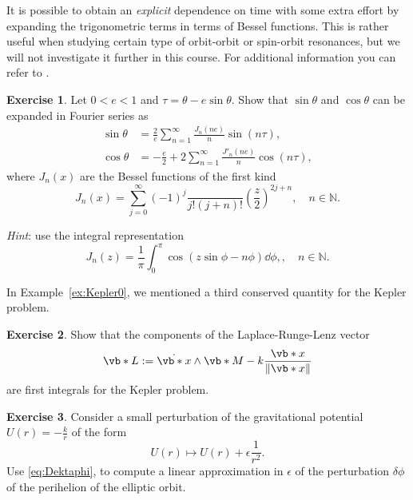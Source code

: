 \documentclass[english,fontsize=11pt,paper=b5]{scrbook}
\numberwithin{equation}{chapter}
\theoremstyle{definition}
\newtheorem{exercise}{Exercise}[chapter]
\begin{document}
    It is possible to obtain an \emph{explicit} dependence on time with some extra effort by expanding the trigonometric terms in terms of Bessel functions. This is rather useful when studying certain type of orbit-orbit or spin-orbit resonances, but we will not investigate it further in this course. For additional information you can refer to \cite{book:arnoldcelestial, book:celletti}.

    \begin{exercise}
      Let $0<e<1$ and $\tau = \theta - e\sin\theta$.
      Show that $\sin\theta$ and $\cos\theta$ can be expanded in Fourier series as
      \begin{align}
        \sin\theta & = \frac2e \sum_{n=1}^\infty \frac{J_n(ne)}{n} \sin(n\tau),        \\
        \cos\theta & = -\frac e2 + 2 \sum_{n=1}^\infty \frac{J'_n(ne)}{n} \cos(n\tau),
      \end{align}
      where $J_n(x)$ are the Bessel functions of the first kind
      \begin{equation}
        J_n(x) = \sum_{j=0}^\infty (-1)^j\frac{}{j!(j+n)!}\left(\frac z2\right)^{2j+n}, \quad n\in\mathbb{N}.
      \end{equation}

      \emph{Hint}: use the integral representation
      \begin{equation}
        J_n(z) = \frac1\pi \int_0^\pi \cos\left(z\sin\phi - n \phi\right)\dd\phi,, \quad n\in\mathbb{N}.
      \end{equation}
    \end{exercise}

    In Example~\ref{ex:Kepler0}, we mentioned a third conserved quantity for the Kepler problem.
    \begin{exercise}
      Show that the components of the Laplace-Runge-Lenz vector
      \begin{equation}
        \vb*{L} := \dot{\vb*{x}}\wedge \vb*{M} - k \frac{\vb*{x}}{\|\vb*{x}\|}
      \end{equation}
      are first integrals for the Kepler problem.
    \end{exercise}

    \begin{exercise}
      Consider a small perturbation of the gravitational potential $U(r) = -\frac kr$ of the form
      \begin{equation}
        U(r) \mapsto U(r) + \epsilon \frac 1{r^2}.
      \end{equation}
      Use \eqref{eq:Dektaphi}, to compute a linear approximation in $\epsilon$ of the perturbation $\delta \phi$ of the perihelion of the elliptic orbit.
    \end{exercise}
\end{document}
